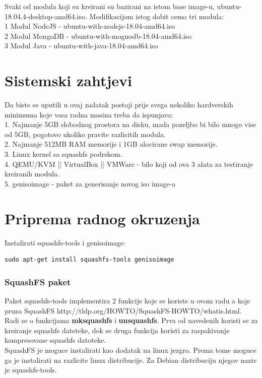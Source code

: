 \documentclass[12pt,vi]{mitthesis}
\begin{document}
Svaki od modula koji su kreirani su bazirani na istom base image-u, ubuntu-18.04.4-desktop-amd64.iso. Modifikacijom istog dobit cemo tri modula:\\ 
1 Modul NodeJS - ubuntu-with-nodejs-18.04-amd64.iso\\
2 Modul MongoDB - ubuntu-with-mognodb-18.04-amd64.iso\\
3 Modul Java - ubuntu-with-java-18.04-amd64.iso\\

\chapter*{Sistemski zahtjevi}
Da biste se uputili u ovaj zadatak postoji prije svega nekoliko hardverskih minimuma koje vasa radna masina treba da ispunjava:\\

1. Najmanje 5GB slobodnog prostora na disku, mada pozeljbo bi bilo mnogo vise od 5GB, pogotovo ukoliko pravite razlicitih modula.\\
2. Najmanje 512MB RAM memorije i 1GB alocirane swap memorije.\\
3. Linux kernel sa squashfs podrskom.\\
4. QEMU/KVM || VirtualBox || VMWare - bilo koji od ova 3 alata za testiranje kreiranih modula.\\
5. genisoimage - paket za generisanje novog iso image-a\\

\chapter*{Priprema radnog okruzenja}
Instalirati squashfs-tools i genisoimage:
\begin{lstlisting}[style=BashInputStyle]
sudo apt-get install squashfs-tools genisoimage
\end{lstlisting}

\subsection*{SquashFS paket}
Paket squashfs-tools implementira 2 funkcije koje se koriste u ovom radu a koje pruza SquashFS http://tldp.org/HOWTO/SquashFS-HOWTO/whatis.html.
Radi se o funkcijama \textbf{mksquashfs} i \textbf{unsquashfs}. Prva od navedenih koristi se za kreiranje squashfs dateteke, dok se druga funkcija koristi za raspakivanje kompresovane squashfs datoteke.\\
SquashFS je moguce instalirati kao dodatak na linux jezgro. Prema tome moguce ga je instalirati na razlicite linux distribucije. Za Debian distribuciju njegov naziv je squashfs-tools.
\end{document}
